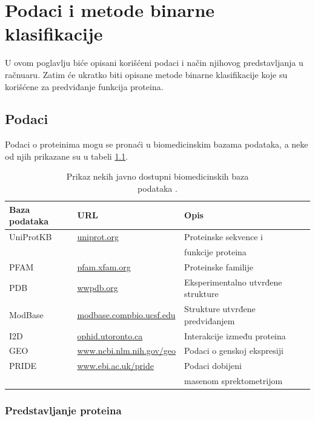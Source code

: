 \chapter{Podaci i metode binarne klasifikacije} %
\label{Chapter3}

U ovom poglavlju biće opisani korišćeni podaci i način njihovog predstavljanja u račnuaru. Zatim će ukratko biti opisane metode binarne klasifikacije koje su korišćene za predviđanje funkcija proteina.


\section{Podaci}

Podaci o proteinima mogu se pronaći u biomedicinskim bazama podataka, a neke od njih prikazane su u tabeli \ref{tab: databases}. 

\begin{table}[H]
	\centering
	\begin{tabular}{|l|l|l|}
		\hline
		Baza podataka & URL & Opis \\
		\hline
		UniProtKB & \url{uniprot.org} & Proteinske sekvence i \\ & & funkcije proteina \\
		\hline
		PFAM & \url{pfam.xfam.org} & Proteinske familije \\
		\hline
		PDB & \url{wwpdb.org} & Eksperimentalno utvrđene strukture \\
		\hline
		ModBase & \url{modbase.compbio.ucsf.edu} & Strukture utvrđene predviđanjem \\
		\hline
		I2D & \url{ophid.utoronto.ca} & Interakcije između proteina \\
		\hline
		GEO & \url{www.ncbi.nlm.nih.gov/geo} & Podaci o genskoj ekspresiji \\
		\hline
		PRIDE & \url{www.ebi.ac.uk/pride} & Podaci dobijeni \\
		& & masenom sprektometrijom \\
		\hline 
	\end{tabular}
	\caption{Prikaz nekih javno dostupni biomedicinskih baza \\ podataka \cite{radivojac, doktJK}.}
	\label{tab: databases}
\end{table}



\subsection{Predstavljanje proteina}

